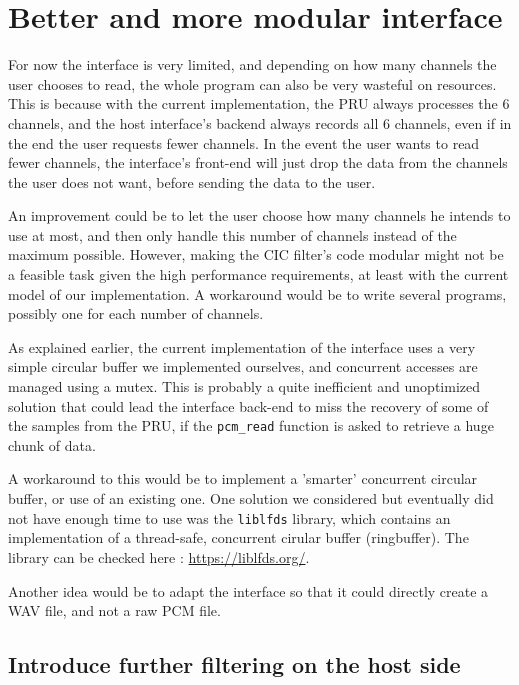 \documentclass[]{report}
\begin{document}
\hypertarget{better-and-more-modular-interface}{%
\section{Better and more modular
interface}\label{better-and-more-modular-interface}}

For now the interface is very limited, and depending on how many channels the user chooses to read, the whole program can also be very wasteful on resources. This is because with the current implementation, the PRU always processes the 6 channels, and the host interface's backend always records all 6 channels, even if in the end the user requests fewer channels. In the event the user wants to read fewer channels, the interface's front-end will just drop the data from the channels the user does not want, before sending the data to the user.

An improvement could be to let the user choose how many channels he intends to use at most, and then only handle this number of channels instead of the maximum possible. However, making the CIC filter's code modular might not be a feasible task given the high performance requirements, at least with the current model of our implementation. A workaround would be to write several programs, possibly one for each number of channels.

As explained earlier, the current implementation of the interface uses a very simple circular buffer we implemented ourselves, and concurrent accesses are managed using a mutex. This is probably a quite inefficient and unoptimized solution that could lead the interface back-end to miss the recovery of some of the samples from the PRU, if the \texttt{pcm\_read} function is asked to retrieve a huge chunk of data.

A workaround to this would be to implement a 'smarter' concurrent circular buffer, or use of an existing one. One solution we considered but eventually did not have enough time to use was the \texttt{liblfds} library, which contains an implementation of a thread-safe, concurrent cirular buffer (ringbuffer). The library can be checked here : 
\url{https://liblfds.org/}.

Another idea would be to adapt the interface so that it could directly create a WAV file, and not a raw PCM file.

\hypertarget{introduce-further-filtering-on-the-host-side}{%
\subsection{Introduce further filtering on the host
side}\label{introduce-further-filtering-on-the-host-side}}
\end{document}
